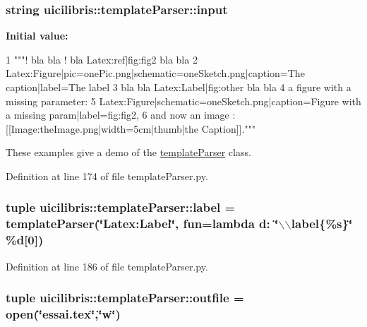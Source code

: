 \hypertarget{namespaceuicilibris_1_1templateParser_a934a014ef49ba892753e6d54dbeb35f3}{
\subsubsection[{input}]{\setlength{\rightskip}{0pt plus 5cm}string {\bf uicilibris\-::template\-Parser\-::input}}}\label{namespaceuicilibris_1_1templateParser_a934a014ef49ba892753e6d54dbeb35f3}
{\bfseries \-Initial value\-:}
\begin{DoxyCode}
1 """{{!}} bla bla {{!}} bla {{Latex:ref|fig:fig2}} bla bla
2 {{Latex:Figure|pic=onePic.png|schematic=oneSketch.png|caption=The
       caption|label=The label}}
3 bla bla {{Latex:Label|fig:other}} bla bla
4 a figure with a missing parameter:
5 {{Latex:Figure|schematic=oneSketch.png|caption=Figure with a missing
       param|label=fig:fig2}},
6 and now an image : [[Image:theImage.png|width=5cm|thumb|the Caption]]."""
\end{DoxyCode}


\-These examples give a demo of the \hyperlink{classuicilibris_1_1templateParser_1_1templateParser}{template\-Parser} class. 



\-Definition at line 174 of file template\-Parser.\-py.

\hypertarget{namespaceuicilibris_1_1templateParser_acb433717f6e1666289157d06c74bb9bc}{
\subsubsection[{label}]{\setlength{\rightskip}{0pt plus 5cm}tuple {\bf uicilibris\-::template\-Parser\-::label} = {\bf template\-Parser}(\char`\"{}\-Latex\-:\-Label\char`\"{}, fun=lambda d\-: \char`\"{}$\backslash$$\backslash$label\{\%s\}\char`\"{} \%d\mbox{[}0\mbox{]})}}\label{namespaceuicilibris_1_1templateParser_acb433717f6e1666289157d06c74bb9bc}


\-Definition at line 186 of file template\-Parser.\-py.

\hypertarget{namespaceuicilibris_1_1templateParser_a0a8c084e3ba11efc717d4352c01ca327}{
\subsubsection[{outfile}]{\setlength{\rightskip}{0pt plus 5cm}tuple {\bf uicilibris\-::template\-Parser\-::outfile} = open(\char`\"{}essai.\-tex\char`\"{},\char`\"{}w\char`\"{})}}\label{namespaceuicilibris_1_1templateParser_a0a8c084e3ba11efc717d4352c01ca327}


